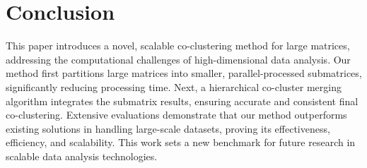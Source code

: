 
\section{Conclusion}
\label{sec:conclude}
This paper introduces a novel, scalable co-clustering method for large matrices, addressing the computational challenges of high-dimensional data analysis. Our method first partitions large matrices into smaller, parallel-processed submatrices, significantly reducing processing time. Next, a hierarchical co-cluster merging algorithm integrates the submatrix results, ensuring accurate and consistent final co-clustering. Extensive evaluations demonstrate that our method outperforms existing solutions in handling large-scale datasets, proving its effectiveness, efficiency, and scalability. This work sets a new benchmark for future research in scalable data analysis technologies.
